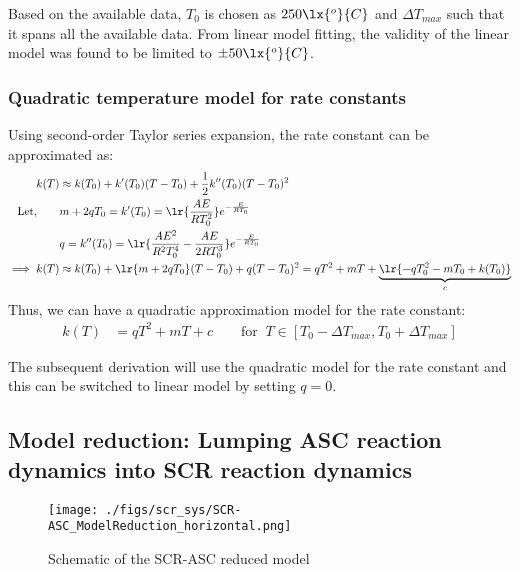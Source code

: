 Based on the available data, $T_0$ is chosen as $250 \lx{^o}{C}$ and $\Delta T_{max}$ such that it spans all the
available data. From linear model fitting, the validity of the linear model was found to be limited to $\pm 50
\lx{^o}{C}$.

\subsubsection{Quadratic temperature model for rate constants}
Using second-order Taylor series expansion, the rate constant can be approximated as:
\begin{align*}
    k(T) &\approx k(T_0) + k'(T_0) (T - T_0) + \frac{1}{2} k''(T_0) (T - T_0)^2\\
    \text{Let,} \qquad
    &m + 2qT_0 = k'(T_0) = \lr{\frac{AE}{RT_0^2}} e^{-\frac{E}{RT_0}} \\
    &q = k''(T_0) = \lr{\frac{A E^2}{R^2 T_0^4} - \frac{A E}{2 R T_0^3}} e^{-\frac{E}{RT_0}} \\
    \implies k(T) &\approx k(T_0) + \lr{m + 2qT_0} (T - T_0) + q (T - T_0)^2
                   = q T^2 + m T + \underbrace{\lr{ -  q T_0^2 - mT_0  + k(T_0)}}_c
\end{align*}
Thus, we can have a quadratic approximation model for the rate constant:
\begin{align}
    k(T) &= q T^2 + m T + c \qquad \text{for } \: T \in [T_0 - \Delta T_{max}, T_0 + \Delta T_{max}]
\end{align}

The subsequent derivation will use the quadratic model for the rate constant and this can be switched to linear model by setting $q = 0$.


\subsection{Model reduction: Lumping ASC reaction dynamics into SCR reaction dynamics}

\begin{figure}[H]
    \centering
    \texttt{[image: ./figs/scr\_sys/SCR-ASC\_ModelReduction\_horizontal.png]}
    \caption{Schematic of the SCR-ASC reduced model}
    \label{fig:scr-asc}
\end{figure}
